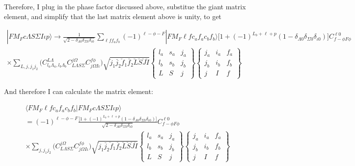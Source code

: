 \documentclass[prl, longbibliography]{revtex4-2}
\begin{document}
Therefore, I plug in the phase factor discussed above, substitue the giant matrix element, and simplify that the last matrix element above is unity, to get

\begin{equation}
\begin{split}
|F M_F c \Lambda S \Sigma I \iota p\rangle \rightarrow \frac{1}{\sqrt{2-\delta_{\Lambda 0}\delta_{\Sigma 0} \delta_{\iota 0}}} \sum_{\ell f f_a f_b}(-1)^{\ell-\phi-F}
|F M_F \ell f c_a f_a c_b f_b\rangle
\Big[1+(-1)^{L_b+\ell+p}(1-\delta_{\Lambda 0}\delta_{\Sigma 0} \delta_{\iota 0})\Big]
C_{f -\phi F \phi}^{\ell 0} \\
\times\sum_{L, j, j_1 j_2} 
\bigg(
C^{L\Lambda}_{l_a \Lambda_a, l_b \Lambda_b} 
C_{L\Lambda S\Sigma}^{j\Omega} 
C_{j\Omega I \iota}^{f \phi}
\bigg)
\sqrt{\breve{j}_1\breve{j_2}\breve{f}_1\breve{f_2}
\breve{L}\breve{S}\breve{J}\breve{I}}
\begin{Bmatrix}
l_a & s_a & j_a\\
l_b & s_b & j_b\\
L & S & j
\end{Bmatrix}
\begin{Bmatrix}
j_a & i_a & f_a\\
j_b & i_b & f_b\\
j & I & f
\end{Bmatrix}
\end{split}
\end{equation}

And therefore I can calculate the matrix element:

\begin{equation}
\begin{split}
\langle F M_F \ell f c_a f_a c_b f_b |F M_F c \Lambda S \Sigma I \iota p\rangle
\\
= 
(-1)^{\ell-\phi-F}
\frac{\Big[1+(-1)^{L_b+\ell+p}(1-\delta_{\Lambda 0}\delta_{\Sigma 0} \delta_{\iota 0})\Big]}
{\sqrt{2-\delta_{\Lambda 0}\delta_{\Sigma 0} \delta_{\iota 0}}} 
C_{f -\phi F \phi}^{\ell 0} 
\\
\times\sum_{j, j_1 j_2} 
\bigg(
C_{L\Lambda S\Sigma}^{j\Omega} 
C_{j\Omega I \iota}^{f \phi}
\bigg)
\sqrt{\breve{j}_1\breve{j_2}\breve{f}_1\breve{f_2}
\breve{L}\breve{S}\breve{J}\breve{I}}
\begin{Bmatrix}
l_a & s_a & j_a\\
l_b & s_b & j_b\\
L & S & j
\end{Bmatrix}
\begin{Bmatrix}
j_a & i_a & f_a\\
j_b & i_b & f_b\\
j & I & f
\end{Bmatrix}
\end{split}
\end{equation}
\end{document}
